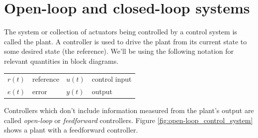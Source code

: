 \section{Open-loop and closed-loop systems}

The \gls{system} or collection of actuators being controlled by a
\gls{control system} is called the \gls{plant}. A \gls{controller} is used to
drive the plant from its current state to some desired state (the
\gls{reference}). We'll be using the following notation for relevant quantities
in block diagrams.
\begin{figurekey}
  \begin{tabular}{llll}
    $r(t)$ & \Gls{reference} & $u(t)$ & \Gls{control input} \\
    $e(t)$ & \Gls{error} & $y(t)$ & \Gls{output} \\
  \end{tabular}
\end{figurekey}

Controllers which don't include information measured from the plant's
\gls{output} are called \textit{open-loop} or \textit{feedforward} controllers.
Figure \ref{fig:open-loop_control_system} shows a plant with a feedforward
controller.
\begin{bookfigure}

  \caption{Open-loop control system}
  \label{fig:open-loop_control_system}
\end{bookfigure}

